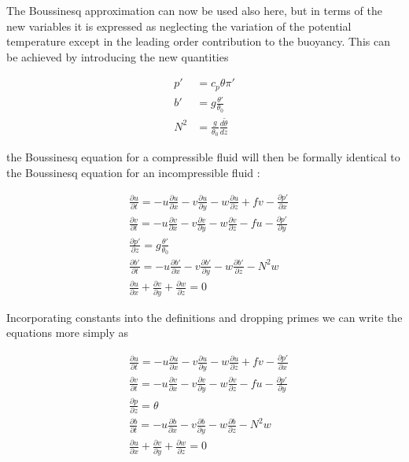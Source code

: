 The Boussinesq approximation can now be used also here, but in terms of
the new variables it is expressed as neglecting the variation of the
potential temperature except in the leading order contribution to the
buoyancy. This can be achieved by introducing the new quantities

\[\begin{aligned}
p' &= c_p\theta\pi' \\
b' &= g\frac{\theta'}{\theta_0} \\
N^2&= \frac{g}{\theta_0}\frac{d \tilde{\theta}}{dz}
\end{aligned}\]

the Boussinesq equation for a compressible fluid will then be formally
identical to the Boussinesq equation for an incompressible fluid :

{\[\begin{aligned}
&\frac{\partial u}{\partial t} = -u\frac{\partial u}{\partial x} -v\frac{\partial u}{\partial y} -w\frac{\partial u}{\partial z} +  f v -\frac{\partial p'}{\partial x}  \\ 
&\frac{\partial v}{\partial t} = -u\frac{\partial v}{\partial x} -v\frac{\partial v}{\partial y} -w\frac{\partial v}{\partial z} -  f u -\frac{\partial p'}{\partial y}  \\
&\frac{\partial p'}{\partial z} = g\frac{\theta'}{\theta_0} \\
&\frac{\partial b'}{\partial t} = -u\frac{\partial b'}{\partial x} -v\frac{\partial b'}{\partial y} -w\frac{\partial b'}{\partial z}  - N^2  w \\
&\frac{\partial u}{\partial x}+\frac{\partial v}{\partial y}+\frac{\partial w}{\partial z}=0
\end{aligned}\]}

Incorporating constants into the definitions and dropping primes we can
write the equations more simply as

{\[\begin{aligned}
&\frac{\partial u}{\partial t} = -u\frac{\partial u}{\partial x} -v\frac{\partial u}{\partial y} -w\frac{\partial u}{\partial z} +  f v -\frac{\partial p'}{\partial x}  \\ 
&\frac{\partial v}{\partial t} = -u\frac{\partial v}{\partial x} -v\frac{\partial v}{\partial y} -w\frac{\partial v}{\partial z} -  f u -\frac{\partial p'}{\partial y}  \\
&\frac{\partial p}{\partial z} = \theta \\
&\frac{\partial b}{\partial t} = -u\frac{\partial b}{\partial x} -v\frac{\partial b}{\partial y} -w\frac{\partial b}{\partial z}  - N^2  w \\
&\frac{\partial u}{\partial x}+\frac{\partial v}{\partial y}+\frac{\partial w}{\partial z}=0
\end{aligned}\]}

